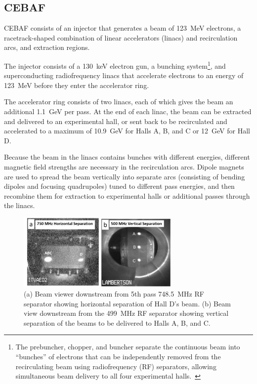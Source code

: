 \subsection{CEBAF}
CEBAF consists of an injector that generates a beam of \SI{123}{MeV} electrons,
a racetrack-shaped combination of linear accelerators (linacs) and
recirculation arcs, and extraction regions.


The injector consists of a \SI{130}{keV} electron gun, a bunching
system\footnote{The prebuncher, chopper, and buncher separate the continuous
beam into ``bunches'' of electrons that can be independently removed from the
recirculating beam using radiofrequency (RF) separators, allowing simultaneous
beam delivery to all four experimental halls.~\cite{Kazimi_2019}}, and
superconducting radiofrequency linacs that accelerate electrons to
an energy of \SI{123}{MeV} before they enter the accelerator ring.


The accelerator ring consists of two linacs, each of which gives
the beam an additional \SI{1.1}{GeV} per pass.
At the end of each linac, the beam can be extracted and delivered to an
experimental hall, or sent back to be recirculated and accelerated to a maximum
of \SI{10.9}{GeV} for Halls A, B, and C or \SI{12}{GeV} for Hall D.


Because the beam in the linacs contains bunches with different energies,
different magnetic field strengths are necessary in the recirculation arcs.
Dipole magnets are used to spread the beam vertically into separate arcs
(consisting of bending dipoles and focusing quadrupoles)
tuned to different pass energies, and then recombine them for extraction to
experimental halls or additional passes through the linacs.


\begin{figure}[!h]
    \centering
    \includegraphics[width=0.7\textwidth]{chap3/RF_separation.jpg}
    \caption{(a) Beam viewer downstream from 5th pass \SI{748.5}{MHz} RF
             separator showing horizontal separation of Hall D's beam.
             (b) Beam view downstream from the \SI{499}{MHz} RF separator
             showing vertical separation of the beams to be delivered to Halls
             A, B, and C.
             }
    \label{fig:RF_separation}
\end{figure}


